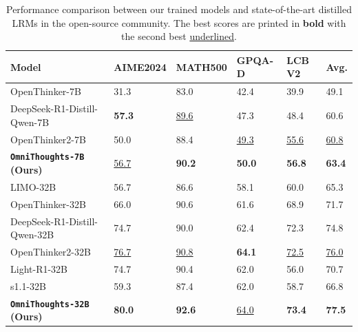 \documentclass{article}
\begin{document}
\begin{table}[t]
\centering
\caption{Performance comparison between our trained models and state-of-the-art distilled LRMs in the open-source community. The best scores are printed in \textbf{bold} with the second best \underline{underlined}.}
\begin{small}
\begin{tabular}{l|llll|l}
\hline
\bf Model & \bf AIME2024 & \bf MATH500 & \bf GPQA-D & \bf LCB V2 & \bf Avg.\\
\hline
OpenThinker-7B & 31.3 & 83.0 & 42.4 & 39.9 & 49.1\\
DeepSeek-R1-Distill-Qwen-7B~\cite{DBLP:journals/corr/abs-2501-12948} & \bf 57.3 & \underline{89.6} & 47.3 & 48.4 & 60.6\\
OpenThinker2-7B  & 50.0 & 88.4 & \underline{49.3} & \underline{55.6} & \underline{60.8}\\
\bf \texttt{OmniThoughts-7B} (Ours) & \underline{56.7} & \bf 90.2 & \bf 50.0 & \bf 56.8 
 & \bf 63.4\\
\hline
LIMO-32B~\cite{DBLP:journals/corr/abs-2502-03387} & 56.7 & 86.6 & 58.1 & 60.0 & 65.3\\
OpenThinker-32B & 66.0 & 90.6 & 61.6 & 68.9 & 71.7\\
DeepSeek-R1-Distill-Qwen-32B~\cite{DBLP:journals/corr/abs-2501-12948} & 74.7 & 90.0 & 62.4 & 72.3 & 74.8\\
OpenThinker2-32B  & \underline{76.7} & \underline{90.8} & \bf 64.1 & \underline{72.5} & \underline{76.0}\\
Light-R1-32B~\cite{DBLP:journals/corr/abs-2503-10460} & 74.7 & 90.4 & 62.0 & 56.0 & 70.7\\
s1.1-32B~\cite{DBLP:journals/corr/abs-2501-19393} & 59.3 & 87.4 & 62.0 & 58.7 & 66.8\\
\bf \texttt{OmniThoughts-32B} (Ours) & \bf 80.0 & \bf 92.6 & \underline{64.0} & \bf 73.4 & \bf 77.5\\
\hline
\end{tabular}
\end{small}
\label{tab:strong}
\vspace{-.5em}
\end{table}
\end{document}
